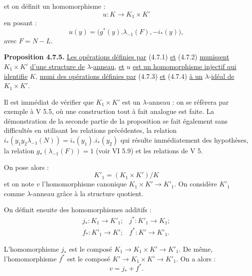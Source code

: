 
et on
définit un homomorphisme :
\[
  u:K\longrightarrow K_1\times K'
\]
en posant :
\[
  u(y)=\bigl(g^*(y).\lambda_{-1}(F),-i_*(y)\bigr),
\]
avec \(F=N-L\).

\textbf{Proposition 4.7.5.} \uline{Les opérations définies par} (4.7.1) \uline{et} (4.7.2) \uline{munissent} \(K_1\times K'\) \uline{d'une structure de} \(\lambda\)-\uline{anneau}, \uline{et} \(u\) \uline{est un homomorphisme injectif qui identifie} \(K\), \uline{muni des opérations définies par} (4.7.3) \uline{et} (4.7.4) \uline{à un} \(\lambda\)-\uline{idéal de} \(K_1\times K'\).

Il est immédiat de vérifier que \(K_1\times K'\) est un \(\lambda\)-anneau : on se réfèrera par exemple à V 5.5, où une construction tout à fait analogue est faite. La démonstration de la seconde partie de la proposition se fait également sans difficultés en utilisant les relations précédentes, la relation \(i_*(y_1y_2\lambda_{-1}(N))=i_*(y_1).i_*(y_2)\) qui résulte immédiatement des hypothèses, la relation \(g_*(\lambda_{-1}(F))=1\) (voir VI 5.9) et les relations de V 5.

On pose alors :
\[
  K'_1=(K_1\times K')/K
\]
et on note \(v\) l'homomorphisme canonique \(K_1\times K'\to K'_1\). On considère \(K'_1\) comme \(\lambda\)-anneau grâce à la structure quotient.

On définit ensuite des homomorphismes additifs :
\[
\begin{array}{llll}
j_*:K_1\to K'_1; & j^*:K'_1\to K_1; \\
f_*:K'_1\to K'; & f^*:K'\to K'_1 .
\end{array}
\]

L'homomorphisme \(j_*\) est le composé \(K_1\to K_1\times K'\to K'_1\). De même, l'homomorphisme \(f^*\) est le composé \(K'\to K_1\times K'\to K'_1\). On a alors :
\[
  v=j_*+f^*.
\]
